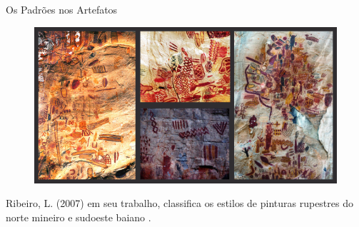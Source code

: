     \begin{frame}[fragile]{Os Padrões nos Artefatos}
        \begin{figure}[H]
        \begin{center}
            \includegraphics[scale=0.60]{images/arte_rupestre.png}
        \end{center}
        \end{figure}

        Ribeiro, L. (2007) em seu trabalho, classifica os estilos de pinturas
        rupestres do norte mineiro e sudoeste baiano 
        \cite{ribeiro2007repensando}.
    \end{frame}

